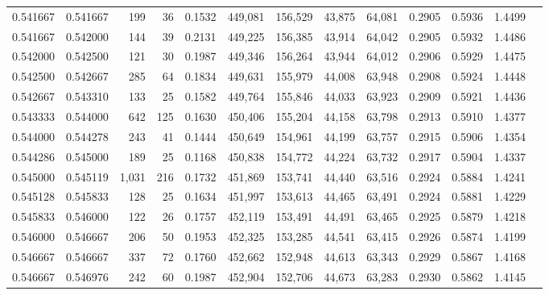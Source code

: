 \begin{tabular}{rrrrrrrrrrrrr}
0.541667 & 0.541667 &   199 &  36 &                                     0.1532 & 449,081 & 156,529 &  43,875 &  64,081 & 0.2905 & 0.5936 & 1.4499 \\
0.541667 & 0.542000 &   144 &  39 &                                     0.2131 & 449,225 & 156,385 &  43,914 &  64,042 & 0.2905 & 0.5932 & 1.4486 \\
0.542000 & 0.542500 &   121 &  30 &                                     0.1987 & 449,346 & 156,264 &  43,944 &  64,012 & 0.2906 & 0.5929 & 1.4475 \\
0.542500 & 0.542667 &   285 &  64 &                                     0.1834 & 449,631 & 155,979 &  44,008 &  63,948 & 0.2908 & 0.5924 & 1.4448 \\
0.542667 & 0.543310 &   133 &  25 &                                     0.1582 & 449,764 & 155,846 &  44,033 &  63,923 & 0.2909 & 0.5921 & 1.4436 \\
0.543333 & 0.544000 &   642 & 125 &                                     0.1630 & 450,406 & 155,204 &  44,158 &  63,798 & 0.2913 & 0.5910 & 1.4377 \\
0.544000 & 0.544278 &   243 &  41 &                                     0.1444 & 450,649 & 154,961 &  44,199 &  63,757 & 0.2915 & 0.5906 & 1.4354 \\
0.544286 & 0.545000 &   189 &  25 &                                     0.1168 & 450,838 & 154,772 &  44,224 &  63,732 & 0.2917 & 0.5904 & 1.4337 \\
0.545000 & 0.545119 & 1,031 & 216 &                                     0.1732 & 451,869 & 153,741 &  44,440 &  63,516 & 0.2924 & 0.5884 & 1.4241 \\
0.545128 & 0.545833 &   128 &  25 &                                     0.1634 & 451,997 & 153,613 &  44,465 &  63,491 & 0.2924 & 0.5881 & 1.4229 \\
0.545833 & 0.546000 &   122 &  26 &                                     0.1757 & 452,119 & 153,491 &  44,491 &  63,465 & 0.2925 & 0.5879 & 1.4218 \\
0.546000 & 0.546667 &   206 &  50 &                                     0.1953 & 452,325 & 153,285 &  44,541 &  63,415 & 0.2926 & 0.5874 & 1.4199 \\
0.546667 & 0.546667 &   337 &  72 &                                     0.1760 & 452,662 & 152,948 &  44,613 &  63,343 & 0.2929 & 0.5867 & 1.4168 \\
0.546667 & 0.546976 &   242 &  60 &                                     0.1987 & 452,904 & 152,706 &  44,673 &  63,283 & 0.2930 & 0.5862 & 1.4145 \\

\end{tabular}
